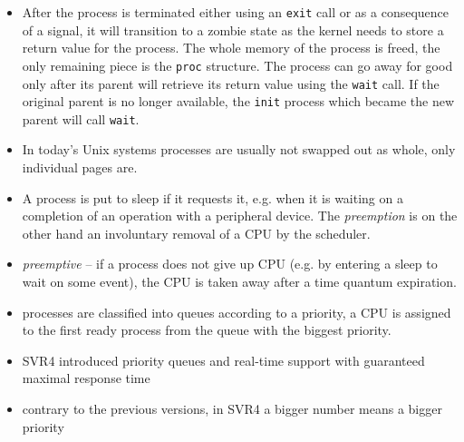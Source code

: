 

\begin{slide}
\begin{center}

\end{center}
\end{slide}

\begin{itemize}
\item After the process is terminated either using an \texttt{exit} call or as a
consequence of a signal, it will transition to a zombie state as the kernel
needs to store a return value for the process. The whole memory of the process is
freed, the only remaining piece is the \texttt{proc} structure. The process can
go away for good only after its parent will retrieve its return value using the
\texttt{wait} call. If the original parent is no longer available, the
\texttt{init} process which became the new parent will call \texttt{wait}.
\item In today's Unix systems processes are usually not swapped out as whole,
only individual pages are.
\item A process is put to sleep if it requests it, e.g. when it is waiting on a
completion of an operation with a peripheral device. The \emph{preemption} is on
the other hand an involuntary removal of a CPU by the scheduler.
\end{itemize}


\begin{slide}
\begin{itemize}
\item \emph{preemptive} -- if a process does not give up CPU
(e.g. by entering a sleep to wait on some event), the CPU is taken away
after a time quantum expiration.
\item processes are classified into queues according to a priority,
a CPU is assigned to the first ready process from the queue with the biggest
priority.
\item SVR4 introduced priority queues and real-time support with guaranteed
maximal response time
\item contrary to the previous versions, in SVR4 a bigger number means a bigger
priority
\end{itemize}
\end{slide}

